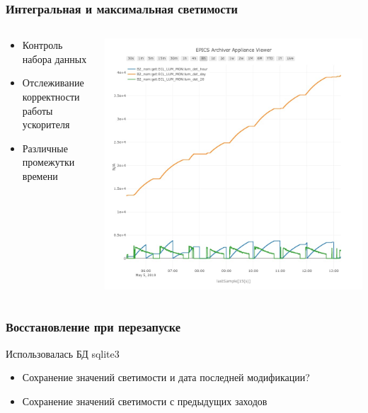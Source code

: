 \documentclass{beamer}
\begin{document}
\begin{frame}
\frametitle{Интегральная и максимальная светимости}
    \begin{columns}
        \begin{column}{0.5\textwidth}
            \begin{itemize}
                \item Контроль набора данных
                \item Отслеживание корректности работы ускорителя
                \item Различные промежутки времени
            \end{itemize}
        \end{column}
        \begin{column}{0.5\textwidth}
            \includegraphics[width=\textwidth]{Int_lum.jpeg}
        \end{column}
    \end{columns}
\end{frame}


\begin{frame}
\frametitle{Восстановление при перезапуске}
    Использовалась БД sqlite3
    \begin{itemize}
        \item Сохранение значений светимости и дата последней модификации?
        \item Сохранение значений светимости с предыдущих заходов
    \end{itemize}
\end{frame}
\end{document}

